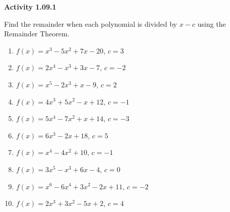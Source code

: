 \vspace{0.3ex}
\noindent\textbf{Activity 1.09.1}

\vspace{0.2ex}

Find the remainder when each polynomial is divided by \( x - c \) using the Remainder Theorem.
\begin{enumerate}
    \item \( f(x) = x^3 - 5x^2 + 7x - 20 \), \( c = 3 \)
    \item \( f(x) = 2x^4 - x^3 + 3x - 7 \), \( c = -2 \)
    \item \( f(x) = x^5 - 2x^3 + x - 9 \), \( c = 2 \)
    \item \( f(x) = 4x^3 + 5x^2 - x + 12 \), \( c = -1 \)
    \item \( f(x) = 5x^4 - 7x^2 + x + 14 \), \( c = -3 \)
    \item \( f(x) = 6x^3 - 2x + 18 \), \( c = 5 \)
    \item \( f(x) = x^4 - 4x^2 + 10 \), \( c = -1 \)
    \item \( f(x) = 3x^5 - x^3 + 6x - 4 \), \( c = 0 \)
    \item \( f(x) = x^6 - 6x^4 + 3x^2 - 2x + 11 \), \( c = -2 \)
    \item \( f(x) = 2x^3 + 3x^2 - 5x + 2 \), \( c = 4 \)
\end{enumerate}